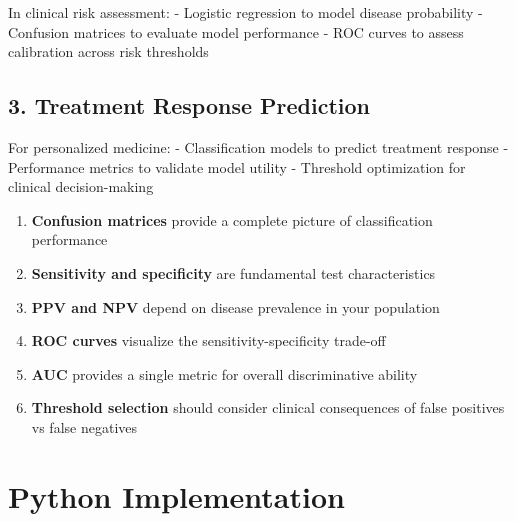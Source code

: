 \documentclass[
  11pt,
  letterpaper,
  oneside]{book}
\providecommand{\tightlist}{%
  \setlength{\itemsep}{0pt}\setlength{\parskip}{0pt}}\usepackage{longtable,booktabs,array}
\begin{document}
In clinical risk assessment: - Logistic regression to model disease
probability - Confusion matrices to evaluate model performance - ROC
curves to assess calibration across risk thresholds

\subsection{3. Treatment Response
Prediction}\label{treatment-response-prediction}

For personalized medicine: - Classification models to predict treatment
response - Performance metrics to validate model utility - Threshold
optimization for clinical decision-making

\begin{tcolorbox}[enhanced jigsaw, toprule=.15mm, left=2mm, opacitybacktitle=0.6, colframe=quarto-callout-note-color-frame, leftrule=.75mm, titlerule=0mm, coltitle=black, colbacktitle=quarto-callout-note-color!10!white, toptitle=1mm, title=\textcolor{quarto-callout-note-color}{\faInfo}\hspace{0.5em}{Key Takeaways}, bottomtitle=1mm, arc=.35mm, rightrule=.15mm, bottomrule=.15mm, breakable, opacityback=0, colback=white]

\begin{enumerate}
\def\labelenumi{\arabic{enumi}.}
\tightlist
\item
  \textbf{Confusion matrices} provide a complete picture of
  classification performance
\item
  \textbf{Sensitivity and specificity} are fundamental test
  characteristics
\item
  \textbf{PPV and NPV} depend on disease prevalence in your population
\item
  \textbf{ROC curves} visualize the sensitivity-specificity trade-off
\item
  \textbf{AUC} provides a single metric for overall discriminative
  ability
\item
  \textbf{Threshold selection} should consider clinical consequences of
  false positives vs false negatives
\end{enumerate}

\end{tcolorbox}

\section{Python Implementation}\label{python-implementation}
\end{document}
